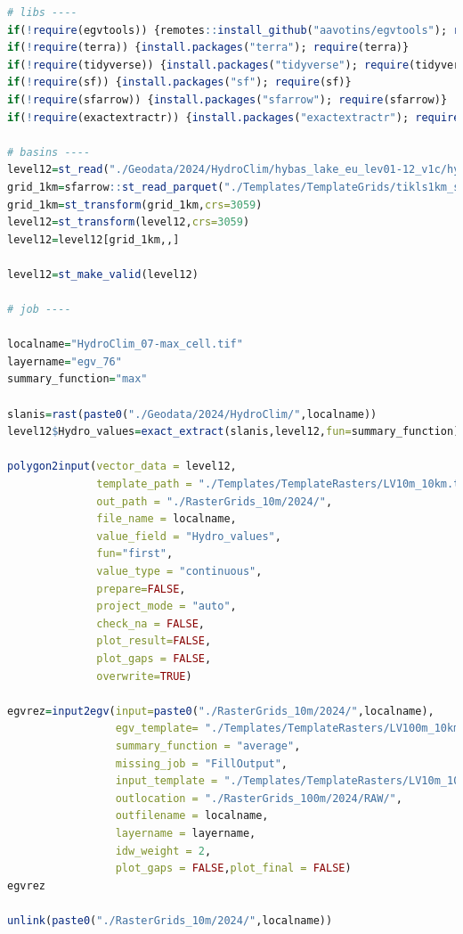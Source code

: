 \documentclass[
]{book}
\begin{document}
\begin{lstlisting}[language=R]
# libs ----
if(!require(egvtools)) {remotes::install_github("aavotins/egvtools"); require(egvtools)}
if(!require(terra)) {install.packages("terra"); require(terra)}
if(!require(tidyverse)) {install.packages("tidyverse"); require(tidyverse)}
if(!require(sf)) {install.packages("sf"); require(sf)}
if(!require(sfarrow)) {install.packages("sfarrow"); require(sfarrow)}
if(!require(exactextractr)) {install.packages("exactextractr"); require(exactextractr)}

# basins ----
level12=st_read("./Geodata/2024/HydroClim/hybas_lake_eu_lev01-12_v1c/hybas_lake_eu_lev12_v1c.shp")
grid_1km=sfarrow::st_read_parquet("./Templates/TemplateGrids/tikls1km_sauzeme.parquet")
grid_1km=st_transform(grid_1km,crs=3059)
level12=st_transform(level12,crs=3059)
level12=level12[grid_1km,,]

level12=st_make_valid(level12)

# job ----

localname="HydroClim_07-max_cell.tif"
layername="egv_76"
summary_function="max"
  
slanis=rast(paste0("./Geodata/2024/HydroClim/",localname))
level12$Hydro_values=exact_extract(slanis,level12,fun=summary_function)
  
polygon2input(vector_data = level12,
              template_path = "./Templates/TemplateRasters/LV10m_10km.tif",
              out_path = "./RasterGrids_10m/2024/",
              file_name = localname,
              value_field = "Hydro_values",
              fun="first",
              value_type = "continuous",
              prepare=FALSE,
              project_mode = "auto",
              check_na = FALSE,
              plot_result=FALSE,
              plot_gaps = FALSE,
              overwrite=TRUE)
  
egvrez=input2egv(input=paste0("./RasterGrids_10m/2024/",localname),
                 egv_template= "./Templates/TemplateRasters/LV100m_10km.tif",
                 summary_function = "average",
                 missing_job = "FillOutput",
                 input_template = "./Templates/TemplateRasters/LV10m_10km.tif",
                 outlocation = "./RasterGrids_100m/2024/RAW/",
                 outfilename = localname,
                 layername = layername,
                 idw_weight = 2,
                 plot_gaps = FALSE,plot_final = FALSE)
egvrez
  
unlink(paste0("./RasterGrids_10m/2024/",localname))
\end{lstlisting}
\end{document}
